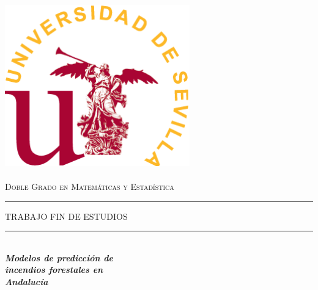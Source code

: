\begin{titlepage}

\newcommand{\HRule}{\rule{\linewidth}{0.5mm}} %

\center %


\begin{minipage}{14cm}
\center

\includegraphics[width=8cm,height=8cm]{logo}\\[0.5cm] %


\textsc{\LARGE Doble Grado en Matemáticas y Estadística}\\[2.5cm] 



\rule[1.7mm]{2cm}{0.5mm}
\hfill
\textsc{\Large TRABAJO FIN DE ESTUDIOS} 
\hfill
\rule[1.7mm]{2cm}{0.5mm} 
\\[0.75cm]

{\Huge
\textbf{\textit{
Modelos de predicción de\\[0.2cm]
incendios forestales en\\[0.35cm]
Andalucía
}}}\\[0.75cm] 


\end{minipage}
\end{titlepage}
